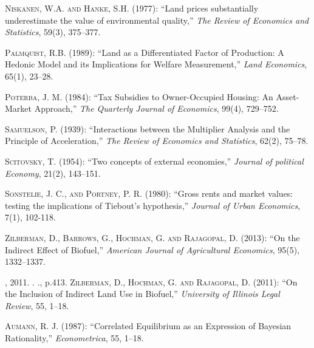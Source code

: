 \documentclass[ecta,nameyear,draft]{econsocart}
\theoremstyle{plain}
\theoremstyle{remark}
\begin{document}
\begin{thebibliography}{}
\textsc{Niskanen, W.A. and Hanke, S.H.} (1977):
``Land prices substantially underestimate the value of environmental quality,''
\textit{The Review of Economics and Statistics}, 59(3), 375--377.
\endbibitem


\textsc{Palmquist, R.B.} (1989):
``Land as a Differentiated Factor of Production: A Hedonic Model and its Implications for Welfare Measurement,''
\textit{Land Economics}, 65(1), 23--28.
\endbibitem

\textsc{Poterba, J. M.} (1984):
``Tax Subsidies to Owner-Occupied Housing: An Asset-Market Approach,''
\textit{The Quarterly Journal of Economics}, 99(4), 729--752.
\endbibitem


\textsc{Samuelson, P.} (1939):
``Interactions between the Multiplier Analysis and the Principle of Acceleration,''
\textit{The Review of Economics and Statistics}, 62(2), 75--78.
\endbibitem

\textsc{Scitovsky, T.} (1954):
``Two concepts of external economies,''
\textit{Journal of political Economy}, 21(2), 143--151.
\endbibitem

\textsc{Sonstelie, J. C., and Portney, P. R.} (1980):
``Gross rents and market values: testing the implications of Tiebout's hypothesis,''
\textit{Journal of Urban Economics}, 7(1), 102-118.
\endbibitem


\textsc{Zilberman, D., Barrows, G., Hochman, G. and Rajagopal, D.} (2013):
``On the Indirect Effect of Biofuel,''
\textit{American Journal of Agricultural Economics}, 95(5), 1332--1337.
\endbibitem

, 2011. . ., p.413. 
\textsc{Zilberman, D., Hochman, G. and Rajagopal, D.} (2011):
``On the Inclusion of Indirect Land Use in Biofuel,''
\textit{University of Illinois Legal Review}, 55, 1--18.
\endbibitem

\textsc{Aumann, R. J.} (1987):
``Correlated Equilibrium as an Expression of Bayesian Rationality,''
\textit{Econometrica}, 55, 1--18.
\endbibitem


\end{thebibliography}
\end{document}
